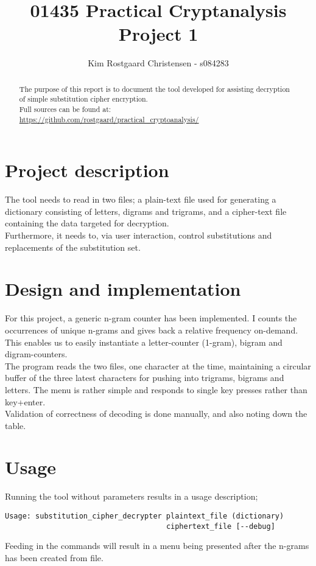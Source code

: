 \documentclass[10pt,a4paper]{article}
\title{01435 Practical Cryptanalysis\\Project 1}
\author{Kim Rostgaard Christensen - s084283}
\begin{document}
\maketitle
\begin{abstract}
The purpose of this report is to document the tool developed for assisting decryption of simple substitution cipher encryption.\\
Full sources can be found at:\\
 \url{https://github.com/rostgaard/practical_cryptoanalysis/}
\end{abstract}

\section*{Project description}
The tool needs to read in two files;
a plain-text file used for generating a dictionary consisting of letters, digrams and trigrams, and a cipher-text file containing the data targeted for decryption.\\
Furthermore, it needs to, via user interaction, control substitutions and replacements of the substitution set.
\section*{Design and implementation}
For this project, a generic n-gram counter has been implemented. I counts the occurrences of unique n-grams and gives back a relative frequency on-demand. This enables us to easily instantiate a letter-counter (1-gram), bigram and digram-counters.\\
The program reads the two files, one character at the time, maintaining a circular buffer of the three latest characters for pushing into trigrams, bigrams and letters.
The menu is rather simple and responds to single key presses rather than key+enter. \\
Validation of correctness of decoding is done manually, and also noting down the table.

\section*{Usage}
Running the tool without parameters results in a usage description;
\begin{small}

\begin{verbatim}
Usage: substitution_cipher_decrypter plaintext_file (dictionary) 
                                     ciphertext_file [--debug]
\end{verbatim}
\end{small}
Feeding in the commands will result in a menu being presented after the n-grams has been created from file.
\end{document}
